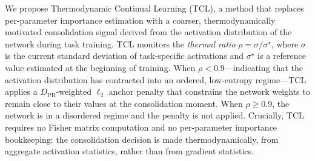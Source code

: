 \documentclass[10pt,a4paper]{article}
\begin{document}
We propose Thermodynamic Continual Learning (TCL), a method that replaces
per-parameter importance estimation with a coarser, thermodynamically motivated
consolidation signal derived from the activation distribution of the network
during task training.
TCL monitors the \emph{thermal ratio} $\rho = \sigma / \sigma^\star$, where
$\sigma$ is the current standard deviation of task-specific activations and
$\sigma^\star$ is a reference value estimated at the beginning of training.
When $\rho < 0.9$---indicating that the activation distribution has contracted
into an ordered, low-entropy regime---TCL applies a $D_\text{PR}$-weighted
$\ell_2$ anchor penalty that constrains the network weights to remain close to
their values at the consolidation moment.
When $\rho \geq 0.9$, the network is in a disordered regime and the penalty is
not applied.
Crucially, TCL requires no Fisher matrix computation and no per-parameter
importance bookkeeping: the consolidation decision is made thermodynamically,
from aggregate activation statistics, rather than from gradient statistics.
\end{document}
